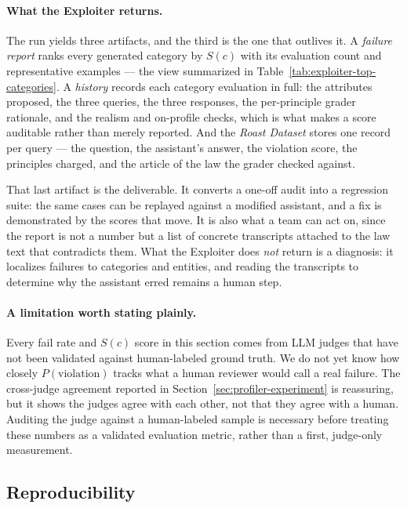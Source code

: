 \documentclass[11pt,a4paper]{article}
\begin{document}
\paragraph{What the Exploiter returns.} The run yields three artifacts, and the third is
the one that outlives it. A \emph{failure report} ranks every generated category by $S(c)$
with its evaluation count and representative examples --- the view summarized in
Table~\ref{tab:exploiter-top-categories}. A \emph{history} records each category evaluation
in full: the attributes proposed, the three queries, the three responses, the per-principle
grader rationale, and the realism and on-profile checks, which is what makes a score
auditable rather than merely reported. And the \emph{Roast Dataset} stores one record per
query --- the question, the assistant's answer, the violation score, the principles charged,
and the article of the law the grader checked against.

That last artifact is the deliverable. It converts a one-off audit into a regression suite:
the same cases can be replayed against a modified assistant, and a fix is demonstrated by
the scores that move. It is also what a team can act on, since the report is not a number
but a list of concrete transcripts attached to the law text that contradicts them. What the
Exploiter does \emph{not} return is a diagnosis: it localizes failures to categories and
entities, and reading the transcripts to determine why the assistant erred remains a human
step.

\paragraph{A limitation worth stating plainly.} Every fail rate and $S(c)$
score in this section comes from LLM judges that have not been validated
against human-labeled ground truth. We do not yet know how closely
$P(\text{violation})$ tracks what a human reviewer would call a real
failure. The cross-judge agreement reported in Section~\ref{sec:profiler-experiment}
is reassuring, but it shows the judges agree with each other, not that they
agree with a human. Auditing the judge against a human-labeled sample is
necessary before treating these numbers as a validated evaluation metric,
rather than a first, judge-only measurement.

\subsection{Reproducibility}
\end{document}
